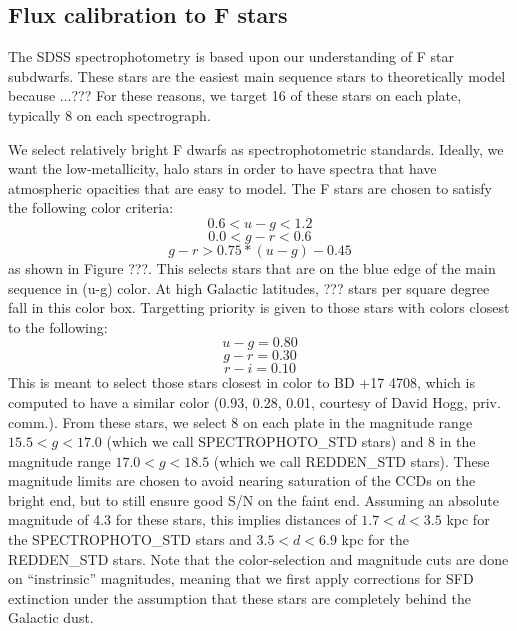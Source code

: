 \documentclass[12pt,preprint]{aastex}
\begin{document}
\subsection{Flux calibration to F stars}

The SDSS spectrophotometry is based upon our understanding
of F star subdwarfs.  These stars are the easiest main sequence
stars to theoretically model because ...???
For these reasons, we target 16 of these stars on each plate,
typically 8 on each spectrograph.



We select relatively bright F dwarfs as spectrophotometric 
standards.  Ideally, we want the low-metallicity, halo stars in order 
to have spectra that have atmospheric opacities that are easy to model.
The F stars are chosen to satisfy the following color criteria:
$$ 0.6 < u-g < 1.2 $$
$$ 0.0 < g-r < 0.6 $$
$$ g-r > 0.75 * (u-g) - 0.45 $$
as shown in Figure ???.
This selects stars that are on the blue edge of the main
sequence in (u-g) color.  At high Galactic latitudes,
??? stars per square degree fall in this color box.
Targetting priority is given to
those stars with colors closest to the following:
$$ u-g = 0.80 $$
$$ g-r = 0.30 $$
$$ r-i = 0.10 $$
This is meant to select those stars closest in color to BD +17 4708,
which is computed to have a similar color (0.93, 0.28, 0.01, courtesy
of David Hogg, priv. comm.).
From these stars, we select 8 on each plate in the magnitude
range $15.5 < g < 17.0$ (which we call SPECTROPHOTO\_STD stars)
and 8 in the magnitude range $17.0 < g < 18.5$ (which we call
REDDEN\_STD stars).
These magnitude limits are chosen to avoid nearing saturation
of the CCDs on the bright end, but to still ensure good S/N
on the faint end.
Assuming an absolute magnitude of 4.3 for these stars, this
implies distances of $1.7 < d < 3.5$ kpc for the SPECTROPHOTO\_STD
stars and $3.5 < d < 6.9$ kpc for the REDDEN\_STD stars.
Note that the color-selection and magnitude cuts are done on
``instrinsic'' magnitudes, meaning that we first apply corrections
for SFD extinction under the assumption that these stars are
completely behind the Galactic dust.
\end{document}
